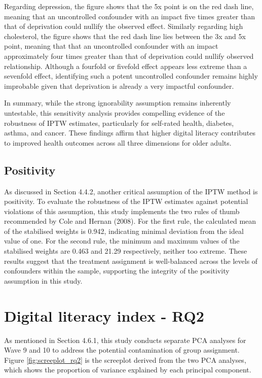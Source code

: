 Regarding depression, the figure shows that the 5x point is on the red dash line, meaning that an uncontrolled confounder with an impact five times greater than that of deprivation could nullify the observed effect. Similarly regarding high cholesterol, the figure shows that the red dash line lies between the 3x and 5x point, meaning that that an uncontrolled confounder with an impact approximately four times greater than that of deprivation could nullify observed relationship. Although a fourfold or fivefold effect appears less extreme than a sevenfold effect, identifying such a potent uncontrolled confounder remains highly improbable given that deprivation is already a very impactful confounder. 

In summary, while the strong ignorability assumption remains inherently untestable, this sensitivity analysis provides compelling evidence of the robustness of IPTW estimates, particularly for self-rated health, diabetes, asthma, and cancer. These findings affirm that higher digital literacy contributes to improved health outcomes across all three dimensions for older adults.

\subsection{Positivity}
As discussed in Section 4.4.2, another critical assumption of the IPTW method is positivity. To evaluate the robustness of the IPTW estimates against potential violations of this assumption, this study implements the two rules of thumb recommended by Cole and Hernan (2008). For the first rule, the calculated mean of the stabilised weights is 0.942, indicating minimal deviation from the ideal value of one. For the second rule, the minimum and maximum values of the stabilised weights are 0.463 and 21.29 respectively, neither too extreme. These results suggest that the treatment assignment is well-balanced across the levels of confounders within the sample, supporting the integrity of the positivity assumption in this study.

\section{Digital literacy index - RQ2}
As mentioned in Section 4.6.1, this study conducts separate PCA analyses for Wave 9 and 10 to address the potential contamination of group assignment. Figure \ref{fig:screeplot_rq2} is the screeplot derived from the two PCA analyses, which shows the proportion of variance explained by each principal component. 

